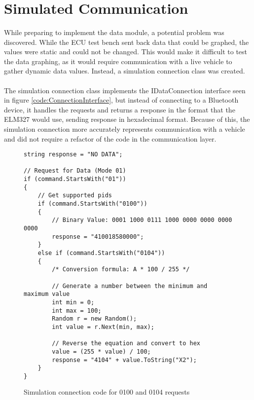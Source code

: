 \section{Simulated Communication}
		\paragraph{}{
		While preparing to implement the data module, a potential problem was discovered. While the ECU test bench sent back data that could be graphed, the values were static and could not be changed. This would make it difficult to test the data graphing, as it would require communication with a live vehicle to gather dynamic data values. Instead, a simulation connection class was created.
		}
		\paragraph{}{
		The simulation connection class implements the IDataConnection interface seen in figure \ref{code:ConnectionInterface}, but instead of connecting to a Bluetooth device, it handles the requests and returns a response in the format that the ELM327 would use, sending response in hexadecimal format. Because of this, the simulation connection more accurately represents communication with a vehicle and did not require a refactor of the code in the communication layer.
		}	
		\begin{figure}[h]
			\begin{lstlisting}
string response = "NO DATA";

// Request for Data (Mode 01)
if (command.StartsWith("01"))
{
	// Get supported pids
	if (command.StartsWith("0100"))
    {
		// Binary Value: 0001 1000 0111 1000 0000 0000 0000 0000
		response = "410018580000";
	}
    else if (command.StartsWith("0104"))
	{
    	/* Conversion formula: A * 100 / 255 */
    	
    	// Generate a number between the minimum and maximum value
        int min = 0;
		int max = 100;
        Random r = new Random();
		int value = r.Next(min, max);

		// Reverse the equation and convert to hex
        value = (255 * value) / 100;
		response = "4104" + value.ToString("X2");
	}
}
			\end{lstlisting}
			\caption{Simulation connection code for 0100 and 0104 requests}
			\label{code:SimConnectionData}
		\end{figure}

